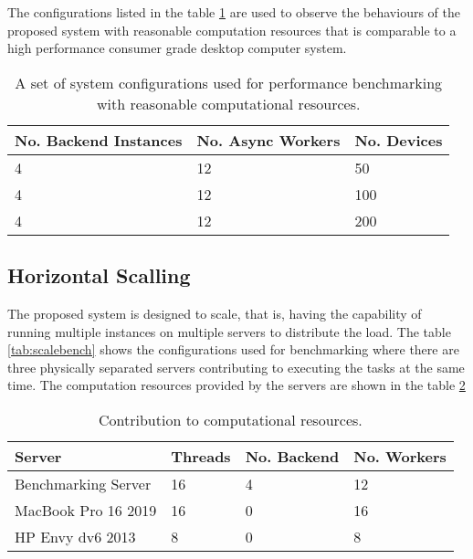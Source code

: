 \documentclass[../thesis.tex]{subfiles}
\begin{document}
The configurations listed in the table \ref{tab:highsysconfbench} are used to observe the behaviours of the proposed system with reasonable computation resources that is comparable to a high performance consumer grade desktop computer system.

\begin{table}[h!]
	\begin{center}
		\caption{A set of system configurations used for performance benchmarking with reasonable computational resources.}
		\label{tab:highsysconfbench}
		\begin{tabular}{l|l|l}
			\toprule
			\textbf{No. Backend Instances} & \textbf{No. Async Workers} & \textbf{No. Devices}\\
			\midrule
			4 & 12 & 50\\
			4 & 12 & 100\\
			4 & 12 & 200\\
			\bottomrule
		\end{tabular}
	\end{center}
\end{table}

\subsection{Horizontal Scalling}

The proposed system is designed to scale, that is, having the capability of running multiple instances on multiple servers to distribute the load. The table \ref{tab:scalebench} shows the configurations used for benchmarking where there are three physically separated servers contributing to executing the tasks at the same time. The computation resources provided by the servers are shown in the table \ref{tab:computecontrib}

\begin{table}[h!]
	\begin{center}
		\caption{Contribution to computational resources.}
		\label{tab:computecontrib}
		\begin{tabular}{l|l|l|l}
			\toprule
			\textbf{Server} & \textbf{Threads} & \textbf{No. Backend} & \textbf{No. Workers}\\
			\midrule
			Benchmarking Server & 16 & 4 & 12\\
			MacBook Pro 16 2019 & 16 & 0 & 16\\
			HP Envy dv6 2013 & 8 & 0 & 8\\
			\bottomrule
		\end{tabular}
	\end{center}
\end{table}
\end{document}
